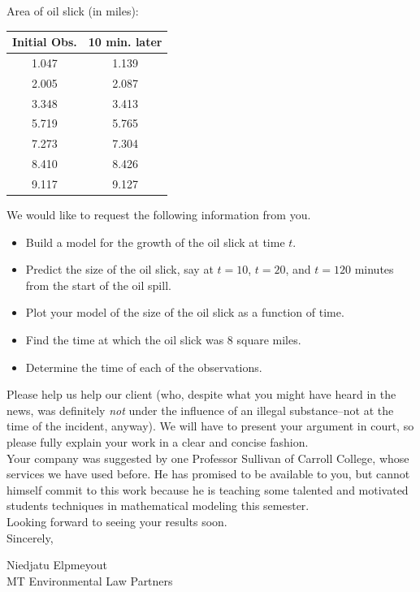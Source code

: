 \begin{lab}
\begin{center} Area of oil slick (in miles):\\
\begin{tabular}{|c|c|}
\hline
Initial Obs.	& 10 min. later\\
\hline \hline
	1.047	& 1.139\\
	\hline
	2.005	& 2.087 \\
	\hline
	3.348	& 3.413\\
	\hline
	5.719	& 5.765\\
	\hline
	7.273	& 7.304\\
	\hline
	8.410	& 8.426\\
	\hline
	9.117	& 9.127\\
	\hline
\end{tabular}
\end{center}
\vspace{1cm}

\noindent  We would like to request the following information from you.
	\begin{itemize}
	\item  Build a model for the growth of the oil slick at time $t.$
	\item  Predict the size of the oil slick, say at $t = 10$, $t = 20$, and $t = 120$ minutes from the start of the 
			oil spill.
	\item  Plot your model of the size of the oil slick as a function of time.
	\item  Find the time at which the oil slick was 8 square miles.
	\item Determine the time of each of the observations.\\ 
	\end{itemize}

\noindent  Please help us help our client (who, despite what you might have heard in the news, was definitely {\it not} under the influence of an illegal substance--not at the time of the incident, anyway).  We will have to present your argument in court, so please fully explain your work in a clear and concise fashion.\\

\noindent  Your company was suggested by one Professor Sullivan of Carroll College, whose
services we have used before.  He has promised to be available to you, but cannot himself
commit to this work because he is teaching some talented and motivated students techniques
in mathematical modeling this semester. \\

\noindent Looking forward to seeing your results soon.\\

\noindent Sincerely,\\ \vspace{0.5cm}

\noindent Niedjatu Elpmeyout\\
MT Environmental Law Partners
\end{lab}




